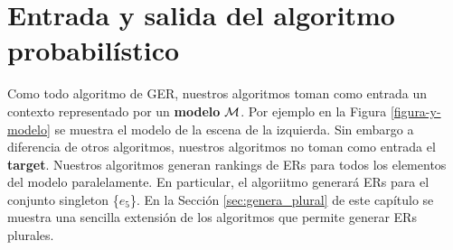 \section{Entrada y salida del algoritmo probabil\'istico}
\label{input_algo}
Como todo algoritmo de GER, nuestros algoritmos toman como entrada un contexto representado por un \textbf{modelo} $\mathcal{M}$. Por ejemplo en la Figura \ref{figura-y-modelo} se muestra el modelo de la escena de la izquierda. Sin embargo a diferencia de otros algoritmos, nuestros algoritmos no toman como entrada el \textbf{target}. Nuestros algoritmos generan rankings de ERs para todos los elementos del modelo paralelamente. En particular, el algoriitmo generar\'a ERs para el conjunto singleton \{$e_5$\}. En la Secci\'on \ref{sec:genera_plural} de este cap\'itulo se muestra una sencilla extensi\'on de los algoritmos que permite generar ERs plurales.
